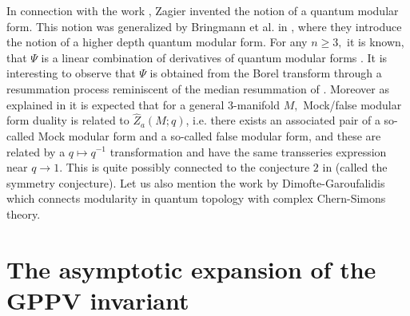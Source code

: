   In connection with the work \cite{LawrenceZagier}, Zagier invented the notion of a quantum modular form. This notion was generalized by Bringmann et al. in \cite{BKM17}, where they introduce the notion of a higher depth quantum modular form.  For any $n\geq 3,$ it is known, that $\Psi$ is a linear combination of derivatives of quantum modular forms \cite{BMA18,BMA19june}. It is interesting to observe that $\Psi$ is obtained  from the Borel transform through a resummation process reminiscent of the median resummation of \cite{CostinGaroufalidis11}. Moreover as explained in \cite{ChengChunFerrariGukovHarrison18} it is expected that for a general $3$-manifold $M,$ Mock/false modular form duality is related to $\widehat{Z}_a(M;q)$, i.e. there exists an associated pair of a so-called Mock modular form and a so-called false modular form, and these are related by a $q \mapsto q^{-1}$ transformation and have the same transseries expression near $q \rightarrow 1.$ This is quite possibly connected to the conjecture $2$ in \cite{Garoufalidis08} (called the symmetry conjecture).  Let us also mention the work \cite{TudorGaroufalidis15} by Dimofte-Garoufalidis which connects modularity in quantum topology with complex Chern-Simons theory.
  
  \section{The asymptotic expansion of the GPPV invariant} \label{sec:radiallimit}
  
